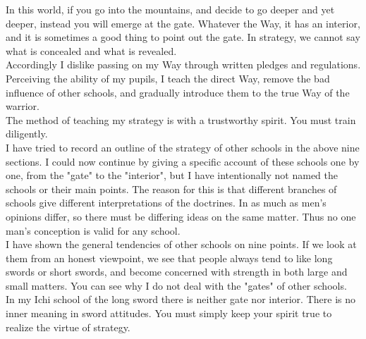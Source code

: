 In this world, if you go into the mountains, and decide to go deeper and yet deeper, instead you will emerge at the gate. Whatever the Way, it has an interior, and it is sometimes a good thing to point out the gate. In strategy, we cannot say what is concealed and what is revealed.\\

Accordingly I dislike passing on my Way through written pledges and regulations. Perceiving the ability of my pupils, I teach the direct Way, remove the bad influence of other schools, and gradually introduce them to the true Way of the warrior.\\

The method of teaching my strategy is with a trustworthy spirit. You must train diligently.\\

I have tried to record an outline of the strategy of other schools in the above nine sections. I could now continue by giving a specific account of these schools one by one, from the "gate" to the "interior", but I have intentionally not named the schools or their main points. The reason for this is that different branches of schools give different interpretations of the doctrines. In as much as men's opinions differ, so there must be differing ideas on the same matter. Thus no one man's conception is valid for any school.\\

I have shown the general tendencies of other schools on nine points. If we look at them from an honest viewpoint, we see that people always tend to like long swords or short swords, and become concerned with strength in both large and small matters. You can see why I do not deal with the "gates" of other schools.\\

In my Ichi school of the long sword there is neither gate nor interior. There is no inner meaning in sword attitudes. You must simply keep your spirit true to realize the virtue of strategy. 
